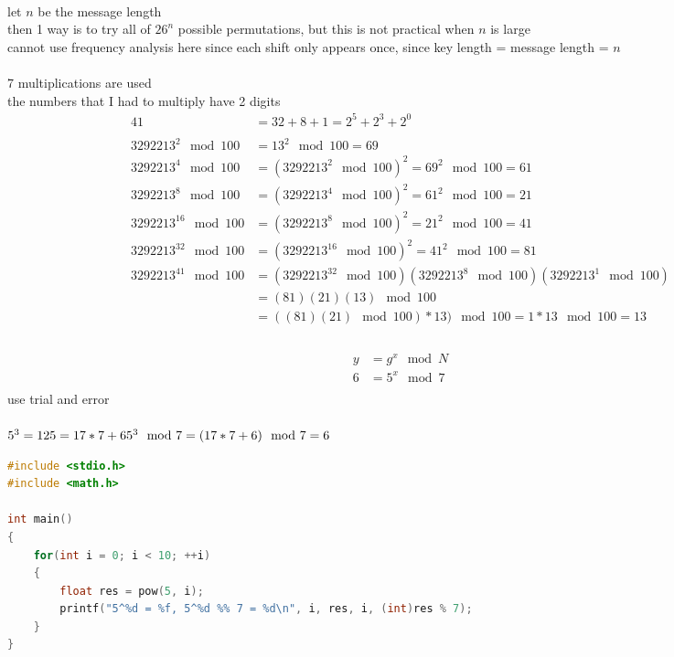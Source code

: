 \documentclass[12pt,border=4pt,multi]{article} %
\begin{document}
\newpage
{}\\
let $n$ be the message length\\
then 1 way is to try all of $26^n$ possible permutations, but this is not practical when $n$ is large\\
cannot use frequency analysis here since each shift only appears once, since key length = message length = $n$\\
\newpage
{}\\
7 multiplications are used\\
the numbers that I had to multiply have 2 digits\\
\begin{align*}
41 &= 32 + 8 + 1 = 2^5 + 2^3 + 2^0\\
\\
3292213^2 \mod 100 &= 13^2 \mod 100 = 69\\
3292213^4 \mod 100 &= (3292213^2 \mod 100)^2 = 69^2 \mod 100 = 61\\
3292213^8 \mod 100 &= (3292213^4 \mod 100)^2 = 61^2 \mod 100 = 21\\
3292213^{16} \mod 100 &= (3292213^8 \mod 100)^2 = 21^2 \mod 100 = 41\\
3292213^{32} \mod 100 &= (3292213^{16} \mod 100)^2 = 41^2 \mod 100 = 81\\
3292213^{41} \mod 100 &= (3292213^{32} \mod 100)(3292213^8 \mod 100)(3292213^1 \mod 100)\\
&= (81)(21)(13) \mod 100\\ 
&= ((81)(21) \mod 100) * 13) \mod 100 = 1 * 13 \mod 100 = 13\\
\end{align*}
\newpage
{}\\
\begin{align*}
y &= g^x \mod N\\
6 &= 5^x \mod 7\\
\end{align*}
use trial and error\\
\\
$5^3 = 125 = 17 * 7 + 6\\
5^3 \mod 7 = (17 * 7 + 6) \mod 7 = 6$
\begin{lstlisting}[language = c++, showstringspaces=false]
#include <stdio.h>
#include <math.h>

int main()
{
    for(int i = 0; i < 10; ++i)
    {
        float res = pow(5, i);
        printf("5^%d = %f, 5^%d %% 7 = %d\n", i, res, i, (int)res % 7);   
    }
}
\end{lstlisting}
\end{document}

